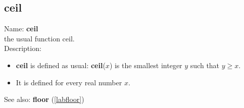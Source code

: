 \subsection{ceil}
\label{labceil}
\noindent Name: \textbf{ceil}\\
the usual function ceil.\\
\noindent Description: \begin{itemize}

\item \textbf{ceil} is defined as usual: \textbf{ceil}($x$) is the smallest integer $y$ such that $y \ge x$.

\item It is defined for every real number $x$.
\end{itemize}
See also: \textbf{floor} (\ref{labfloor})
